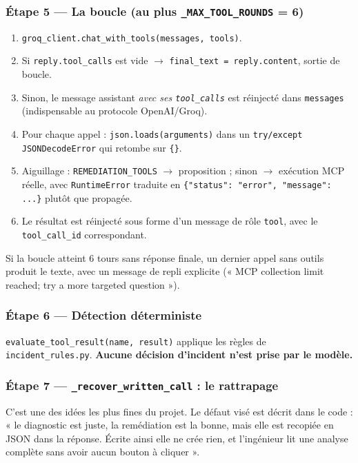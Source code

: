 \documentclass[11pt,a4paper]{report}
\newcommand{\file}[1]{\texttt{\small #1}}
\newcommand{\fn}[1]{\texttt{\small\textcolor{oasisviolet}{#1}}}
\newcommand{\arrowto}{\ensuremath{\rightarrow}}
\begin{document}
\subsubsection*{Étape 5 --- La boucle (au plus \fn{\_MAX\_TOOL\_ROUNDS} = 6)}

\begin{enumerate}
  \item \fn{groq\_client.chat\_with\_tools(messages, tools)}.
  \item Si \texttt{reply.tool\_calls} est vide \arrowto{} \texttt{final\_text =
  reply.content}, sortie de boucle.
  \item Sinon, le message assistant \emph{avec ses \texttt{tool\_calls}} est
  réinjecté dans \texttt{messages} (indispensable au protocole OpenAI/Groq).
  \item Pour chaque appel : \texttt{json.loads(arguments)} dans un
  \texttt{try/except JSONDecodeError} qui retombe sur \texttt{\{\}}.
  \item Aiguillage : \texttt{REMEDIATION\_TOOLS} \arrowto{} proposition ;
  sinon \arrowto{} exécution MCP réelle, avec \texttt{RuntimeError} traduite en
  \texttt{\{"status": "error", "message": ...\}} plutôt que propagée.
  \item Le résultat est réinjecté sous forme d'un message de rôle
  \texttt{tool}, avec le \texttt{tool\_call\_id} correspondant.
\end{enumerate}

\noindent
Si la boucle atteint 6 tours sans réponse finale, un dernier appel sans outils
produit le texte, avec un message de repli explicite (« MCP collection limit
reached; try a more targeted question »).

\subsubsection*{Étape 6 --- Détection déterministe}
\fn{evaluate\_tool\_result(name, result)} applique les règles de
\file{incident\_rules.py}. \textbf{Aucune décision d'incident n'est prise par le
modèle.}

\subsubsection*{Étape 7 --- \fn{\_recover\_written\_call} : le rattrapage}

C'est une des idées les plus fines du projet. Le défaut visé est décrit dans le
code : « le diagnostic est juste, la remédiation est la bonne, mais elle est
recopiée en JSON dans la réponse. Écrite ainsi elle ne crée rien, et l'ingénieur
lit une analyse complète sans avoir aucun bouton à cliquer ».
\end{document}
